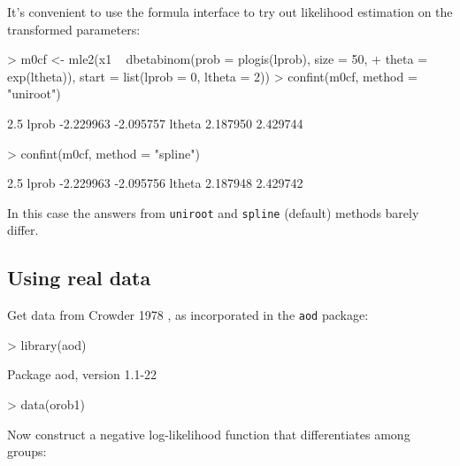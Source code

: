 \documentclass{article}
\newcommand{\code}[1]{{\tt #1}}
\begin{document}
It's convenient to use the formula interface
to try out likelihood estimation on the
transformed parameters:
\begin{Schunk}
\begin{Sinput}
> m0cf <- mle2(x1 ~ dbetabinom(prob = plogis(lprob), size = 50, 
+     theta = exp(ltheta)), start = list(lprob = 0, ltheta = 2))
> confint(m0cf, method = "uniroot")
\end{Sinput}
\begin{Soutput}
           2.5 %
lprob  -2.229963 -2.095757
ltheta  2.187950  2.429744
\end{Soutput}
\begin{Sinput}
> confint(m0cf, method = "spline")
\end{Sinput}
\begin{Soutput}
           2.5 %
lprob  -2.229963 -2.095756
ltheta  2.187948  2.429742
\end{Soutput}
\end{Schunk}

In this case the answers from \code{uniroot}
and \code{spline} (default) methods barely
differ.

\subsection{Using real data}
Get data from Crowder 1978 \cite{Crowder1978},
as incorporated in the \code{aod} package:
\begin{Schunk}
\begin{Sinput}
> library(aod)
\end{Sinput}
\begin{Soutput}
Package aod, version 1.1-22 
\end{Soutput}
\begin{Sinput}
> data(orob1)
\end{Sinput}
\end{Schunk}

Now construct a negative log-likelihood
function that differentiates among groups:
\begin{Schunk}
\end{Schunk}
\end{document}
